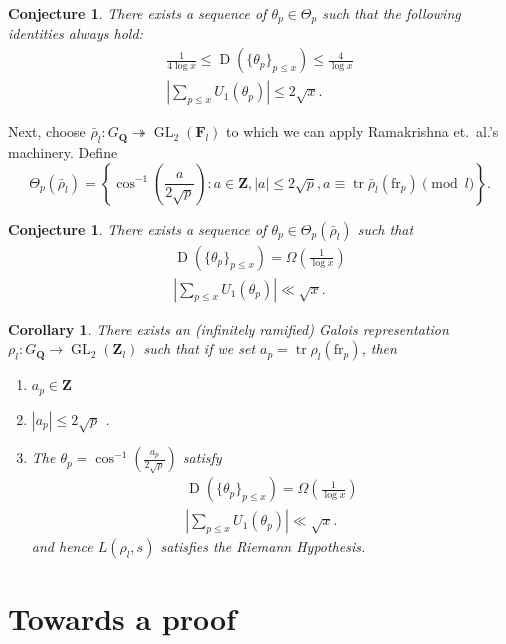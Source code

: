 \documentclass{article}
\DeclareMathOperator{\disc}{D}
\DeclareMathOperator{\GL}{GL}
\DeclareMathOperator{\tr}{tr}
\newcommand{\bF}{\mathbf{F}}
\newcommand{\bQ}{\mathbf{Q}}
\newcommand{\bZ}{\mathbf{Z}}
\newcommand{\fr}{\mathrm{fr}}
\newtheorem{corollary}[subsection]{Corollary}
\newtheorem{conjecture}[subsection]{Conjecture}
\begin{document}
\begin{conjecture}
There exists a sequence of $\theta_p\in \Theta_p$ such that the following 
identities always hold:
\begin{align*}
	\frac{1}{4\log x} \leqslant \disc(\{\theta_p\}_{p\leqslant x}) \leqslant \frac{4}{\log x} \\
	\left| \sum_{p\leqslant x} U_1(\theta_p)\right| \leqslant 2 \sqrt{x} .
\end{align*}
\end{conjecture}

Next, choose $\bar\rho_l \colon G_\bQ \twoheadrightarrow \GL_2(\bF_l)$ to 
which we can apply Ramakrishna et.~al.'s machinery. Define 
\[
	\Theta_p(\bar\rho_l) = \left\{\cos^{-1}\left(\frac{a}{2\sqrt p}\right) : a\in \bZ, |a|\leqslant 2\sqrt p, a \equiv \tr \bar\rho_l(\fr_p)\pmod l\right\} .
\]
\begin{conjecture}
There exists a sequence of $\theta_p\in \Theta_p(\bar\rho_l)$ such that 
\begin{align*}
	\disc(\{\theta_p\}_{p\leqslant x}) =\Omega\left( \frac{1}{\log x} \right)\\
	\left| \sum_{p\leqslant x} U_1(\theta_p)\right| \ll \sqrt{x} .
\end{align*}
\end{conjecture}

\begin{corollary}
There exists an (infinitely ramified) Galois representation 
$\rho_l\colon G_\bQ \to \GL_2(\bZ_l)$ such that if we set 
$a_p = \tr\rho_l(\fr_p)$, then 
\begin{enumerate}
\item
$a_p\in \bZ$
\item
$|a_p| \leqslant 2\sqrt p$ .
\item
The $\theta_p = \cos^{-1}\left(\frac{a_p}{2\sqrt p}\right)$ satisfy 
\begin{align*}
	\disc(\{\theta_p\}_{p\leqslant x}) =\Omega\left( \frac{1}{\log x} \right)\\
	\left| \sum_{p\leqslant x} U_1(\theta_p)\right| \ll \sqrt{x} .
\end{align*}
and hence $L(\rho_l,s)$ satisfies the Riemann Hypothesis. 
\end{enumerate}
\end{corollary}





\section{Towards a proof}
\end{document}
